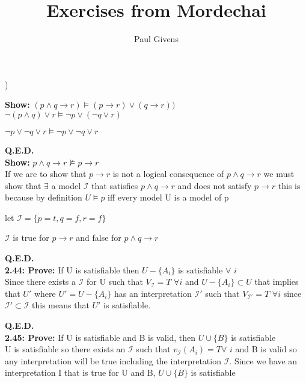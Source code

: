 \documentclass[letterpaper]{article}
\title{Exercises from Mordechai}
\author{Paul Givens}
\begin{document}
) 

\textbf{Show:}
$ (p \wedge q \rightarrow r) \vDash (p \rightarrow r) \vee (q \rightarrow r)) $
\\[1ex]

$ \neg (p \wedge q) \vee r \vDash \neg p \vee (\neg q \vee r) $

$ \neg p \vee \neg q \vee r \vDash \neg p \vee \neg q \vee r $ 

\textbf{Q.E.D.}
\\[1ex]

\textbf{Show:}
$ p \wedge q \rightarrow r \nvDash p \rightarrow r $
\\[1ex]

If we are to show that $ p \rightarrow r $ is not a logical consequence of
$ p \wedge q \rightarrow r $ we must show that $ \exists $ a model
$ \mathscr{I} $ that satisfies $ p \wedge q \rightarrow r $ and does not 
satisfy $ p \rightarrow r $ this is because by definition 
$ U \vDash p $ iff every model U is a model of p 

let $ \mathscr{I} = \{ p = t, q = f, r = f\}$ 

$ \mathscr{I} $ is true for $ p \rightarrow r $ and false for 
$ p \wedge q \rightarrow r $

\textbf{Q.E.D.}
\\[1ex]

\textbf{2.44: Prove:}
If U is satisfiable then $ U - \{A _{i} \} $ is satisfiable $ \forall $ $i$ 
\\[1ex]

Since there exists a $ \mathscr{I} $ for U such that $V_{\mathscr{I}} = T $ 
$\forall i$ and $  U - \{A _{i} \} \subset U$ that implies that $U'$ 
where $U' =  U - \{A _{i} \}$ has an interpretation $\mathscr{I}'$ such that 
$V_{\mathscr{I}'} = T $ $\forall i$ since $\mathscr{I}' \subset \mathscr{I}$
this means that $U'$ is satisfiable.

\textbf{Q.E.D.}
\\[1ex]

\textbf{2.45: Prove:}
If U is satisfiable and B is valid, then $ U \cup \{B\} $ is satisfiable
\\[1ex]

U is satisfiable so there exists an $\mathscr{I}$ such that $v_{\mathscr{I}}
(A_{i}) = T \forall$ $i$ and B is valid so any interpretation will be true
including the interpretation $\mathscr{I}$. Since we have an interpretation
I that is true for U and B, $U \cup \{B\} $ is satisfiable
\end{document}
